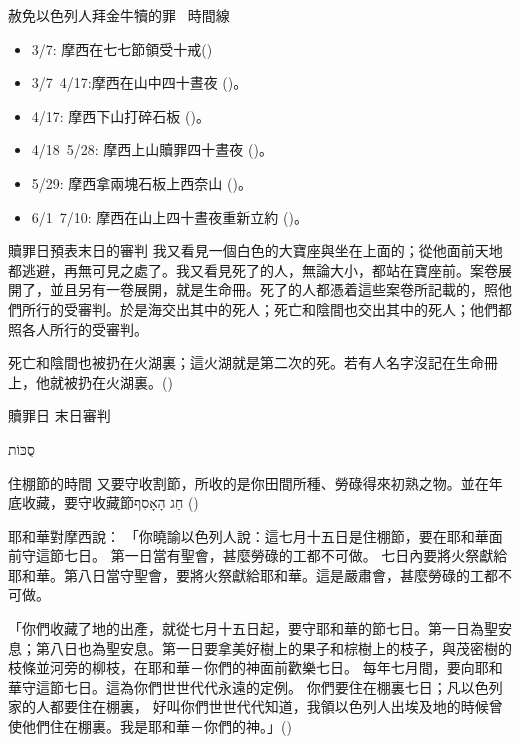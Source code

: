 \documentclass{beamer}
\newcommand{\topic}[1]{
\begin{frame}
    \centering
    \vspace*{1cm}
    {\fontsize{40}{48}\selectfont #1\par}
    \vfill
\end{frame}
}
\newcommand{\conclusion}[2]{
\begin{frame}
    \centering
    \vspace*{1cm}
    {\fontsize{40}{48}\selectfont #1 \textemdash #2\par}
    \vfill
\end{frame}
}
\newcommand{\parvspace}{\par\vspace{0.5em}}
\begin{document}
\begin{frame}{赦免以色列人拜金牛犢的罪 \textendash\ 時間線}
    \begin{itemize}
        \item 3/7: 摩西在七七節領受十戒()\parencite{TenCommandmentsOnShavuot}
        \item 3/7\textendash\ 4/17:摩西在山中\alert{四十晝夜} ()。
        \item 4/17: 摩西下山打碎石板 ()。
        \item 4/18\textendash\ 5/28: 摩西上山贖罪\alert{四十晝夜} ()。
        \item 5/29: 摩西拿兩塊石板上西奈山 ()。
        \item 6/1\textendash\ 7/10: 摩西在山上\alert{四十晝夜}重新立約 ()。
    \end{itemize}
\end{frame}

\begin{frame}{贖罪日預表末日的審判}
    我又看見一個白色的大寶座與坐在上面的；從他面前天地都逃避，再無可見之處了。我又看見死了的人，無論大小，都站在寶座前。案卷展開了，並且另有一卷展開，就是生命冊。\alert{死了的人都憑着這些案卷所記載的，照他們所行的受審判}。於是海交出其中的死人；死亡和陰間也交出其中的死人；他們都照各人所行的受審判。\parvspace
    死亡和陰間也被扔在火湖裏；這火湖就是第二次的死。\alert{若有人名字沒記在生命冊上，他就被扔在火湖裏}。()\parvspace
\end{frame}

\conclusion{贖罪日}{末日審判}

\topic{\texthebrew{סֻכּוֹת}}

\begin{frame}{住棚節的時間}
    又要守收割節，所收的是你田間所種、勞碌得來初熟之物。並在年底收藏，要守\alert{收藏節\texthebrew{חַג הָאָסִף}} ()\parvspace
    耶和華對摩西說： 「你曉諭以色列人說：這\alert{七月十五日是住棚節，要在耶和華面前守這節七日}。 第一日當有聖會，甚麼勞碌的工都不可做。 七日內要將火祭獻給耶和華。\alert{第八日當守聖會}，要將火祭獻給耶和華。這是嚴肅會，甚麼勞碌的工都不可做。\parvspace
    \textellipsis{}\parvspace
    「你們收藏了地的出產，就\alert{從七月十五日起，要守耶和華的節七日。第一日為聖安息；第八日也為聖安息}。第一日要拿美好樹上的果子和棕樹上的枝子，與茂密樹的枝條並河旁的柳枝，在耶和華－你們的神面前歡樂七日。 每年七月間，要向耶和華守這節七日。這為你們世世代代永遠的定例。 \alert{你們要住在棚裏七日；凡以色列家的人都要住在棚裏， 好叫你們世世代代知道，我領以色列人出埃及地的時候曾使他們住在棚裏。我是耶和華－你們的神}。」()\parvspace
\end{frame}
\end{document}
